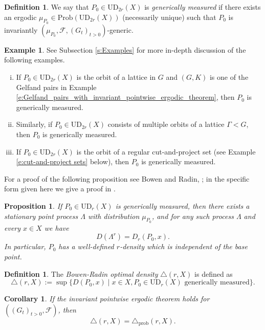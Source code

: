 \documentclass[12pt,reqno,a4paper]{amsart}
\theoremstyle{theorem}
\newtheorem{proposition}[theorem]{Proposition}
\newtheorem{corollary}[theorem]{Corollary}
\theoremstyle{definition}
\newtheorem{definition}[theorem]{Definition}
\newtheorem{example}[theorem]{Example}
\numberwithin{theorem}{section}
\numberwithin{equation}{section}
\newcommand{\UD}{\mathrm{UD}}
\begin{document}
\begin{definition}\label{d:generically_measured}
	We say that $P_0\in \UD_{2r}(X)$ is \emph{generically measured} if there exists an ergodic $\mu_{P_0}\in \mathrm{Prob}(\UD_{2r}(X))$ (necessarily unique) such that $P_0$ is invariantly $(\mu_{P_0}, \mathcal{F}, (G_t)_{t>0})$-generic. 
\end{definition}
\begin{example} See Subsection \ref{s:Examples} for more in-depth discussion of the following examples.
\begin{enumerate}[(i)]
	\item If $P_0\in \UD_{2r}(X)$ is the orbit of a lattice in $G$ and $(G,K)$ is one of the Gelfand pairs in Example \ref{e:Gelfand_pairs_with_invariant_pointwise_ergodic_theorem}, then $P_0$ is generically measured.
	\item Similarly, if $P_0\in \UD_{2r}(X)$ consists of multiple orbits of a lattice $\Gamma < G$, then $P_0$ is generically measured.
	\item If $P_0\in \UD_{2r}(X)$ is the orbit of a regular cut-and-project set (see Example \ref{e:cut-and-project sets} below), then $P_0$ is generically measured.
\end{enumerate}
\end{example}
For a proof of the following proposition see Bowen and Radin, \cite{Bowen2004}; in the specific form given here we give a proof in \cite{HartnickWackenhuthDensity}.
\begin{proposition}
	If $P_0\in \UD_r(X)$ is generically measured, then there exists a stationary point process $\Lambda$ with distribution $\mu_{P_0}$, and for any such process $\Lambda$ and every $x\in X$ we have 
	\[D(\Lambda^r) = D_r(P_0, x).\]
	In particular, $P_0$ has a well-defined $r$-density which is independent of the base point.
\end{proposition}
	
	
\begin{definition}\label{d:Bowen_Radin_optimal_density}
The \emph{Bowen-Radin optimal density} $\triangle(r,X)$ is defined as 
\[\triangle(r,X):=\sup \{D(P_0, x) \mid x\in X, P_0\in \UD_r(X) \text{ generically measured}\}.\]
\end{definition}

\begin{corollary}\label{c:equiv_defs_optimal_density}
	If the invariant pointwise ergodic theorem holds for $((G_t)_{t>0}, \mathcal{F})$, then 
	\[\triangle(r,X) = \triangle_{\mathrm{prob}}(r,X).\]
\end{corollary}
\end{document}
